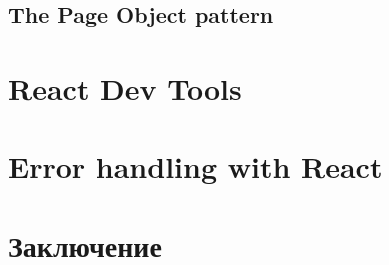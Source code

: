 \subsection{The Page Object pattern}

\section{React Dev Tools}

\section{Error handling with React}

\section{Заключение}

















